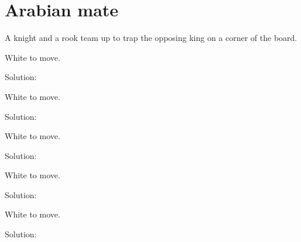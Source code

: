 \documentclass{book}
\begin{document}
\section{Arabian mate}
A knight and a rook team up to trap the opposing king on a corner of the board.\begin{multicols}{2} 
\begin{samepage} 
\newgame 


 
\showboard
 
 White to move. 
 
Solution: 
 
\end{samepage}\begin{samepage} 
\newgame 


 
\showboard
 
 White to move. 
 
Solution: 
 
\end{samepage}\begin{samepage} 
\newgame 


 
\showboard
 
 White to move. 
 
Solution: 
 
\end{samepage}\begin{samepage} 
\newgame 


 
\showboard
 
 White to move. 
 
Solution: 
 
\end{samepage}\begin{samepage} 
\newgame 


 
\showboard
 
 White to move. 
 
Solution: 
 
\end{samepage}\begin{samepage} 
\newgame 


\end{samepage}
\end{multicols}
\end{document}
